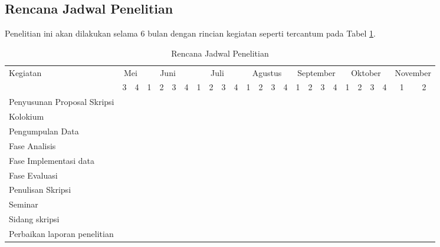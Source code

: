 \subsection*{Rencana Jadwal Penelitian}

Penelitian ini akan dilakukan selama 6 bulan dengan rincian kegiatan seperti tercantum pada Tabel \ref{tab:jadwal}.

\begin{table}[h!]
	\begin{center}
		\caption{Rencana Jadwal Penelitian}
		\label{tab:jadwal}
		\footnotesize
		\begin{tabular}{|l|c|c|c|c|c|c|c|c|c|c|c|c|c|c|c|c|c|c|c|c|c|c|c|c|}
			\hline
			\multirow{2}{*}{Kegiatan}&\multicolumn{2}{c|}{Mei}&\multicolumn{4}{c|}{Juni}&\multicolumn{4}{c|}{Juli}&\multicolumn{4}{c|}{Agustus}&\multicolumn{4}{c|}{September}&\multicolumn{4}{c|}{Oktober}&\multicolumn{2}{c|}{November}\\
			\cline{2-25}
			&3&4&1&2&3&4&1&2&3&4&1&2&3&4&1&2&3&4&1&2&3&4&1&2\\
			\hline
			Penyusunan Proposal Skripsi&\cellcolor{black}&\cellcolor{black}&\cellcolor{black}&\cellcolor{black}&\cellcolor{black}&&&&&&&&&&&&&&&&&&&\\
			\hline
			Kolokium&&&&&&\cellcolor{black}&&&&&&&&&&&&&&&&&&\\
			\hline
			Pengumpulan Data&\cellcolor{black}&\cellcolor{black}&\cellcolor{black}&\cellcolor{black}&\cellcolor{black}&\cellcolor{black}&&&&&&&&&&&&&&&&&&\\
			\hline
			Fase Analisis&&&&&&&\cellcolor{black}&\cellcolor{black}&&&&&&&&&&&&&&&&\\
			\hline
			Fase Implementasi data&&&&&&&&&\cellcolor{black}&\cellcolor{black}&\cellcolor{black}&\cellcolor{black}&\cellcolor{black}&\cellcolor{black}&\cellcolor{black}&\cellcolor{black}&&&&&&&&\\
			\hline
			Fase Evaluasi&&&&&&&&&&&&&&&&&\cellcolor{black}&\cellcolor{black}&&&&&&\\
			\hline
			Penulisan Skripsi&&&&&&&&&\cellcolor{black}&\cellcolor{black}&\cellcolor{black}&\cellcolor{black}&\cellcolor{black}&\cellcolor{black}&\cellcolor{black}&\cellcolor{black}&\cellcolor{black}&\cellcolor{black}&\cellcolor{black}&&&&&\\
			\hline
			Seminar&&&&&&&&&&&&&&&&&&&&\cellcolor{black}&&&&\\
			\hline
			Sidang skripsi&&&&&&&&&&&&&&&&&&&&&&\cellcolor{black}&&\\
			\hline
			Perbaikan laporan penelitian&&&&&&&&&&&&&&&&&&&&&&&\cellcolor{black}&\cellcolor{black}\\
			\hline
		\end{tabular}
		\normalsize
	\end{center}
\end{table}